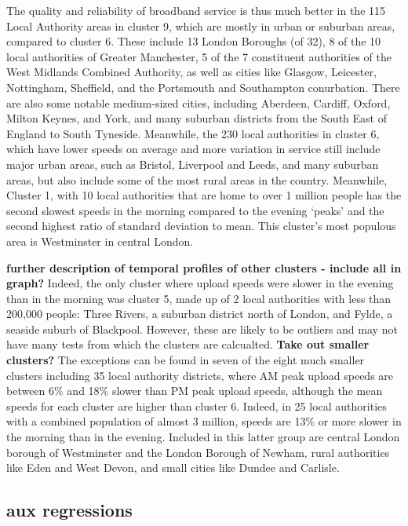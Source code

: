 \documentclass[]{interact}
\theoremstyle{plain}%
\theoremstyle{definition}
\theoremstyle{remark}
\begin{document}
The quality and reliability of broadband service is thus much better in
the 115 Local Authority areas in cluster 9, which are mostly in urban or
suburban areas, compared to cluster 6. These include 13 London Boroughs
(of 32), 8 of the 10 local authorities of Greater Manchester, 5 of the 7
constituent authorities of the West Midlands Combined Authority, as well
as cities like Glasgow, Leicester, Nottingham, Sheffield, and the
Portsmouth and Southampton conurbation. There are also some notable
medium-sized cities, including Aberdeen, Cardiff, Oxford, Milton Keynes,
and York, and many suburban districts from the South East of England to
South Tyneside. Meanwhile, the 230 local authorities in cluster 6, which
have lower speeds on average and more variation in service still include
major urban areas, such as Bristol, Liverpool and Leeds, and many
suburban areas, but also include some of the most rural areas in the
country. Meanwhile, Cluster 1, with 10 local authorities that are home
to over 1 million people has the second slowest speeds in the morning
compared to the evening `peaks' and the second highest ratio of standard
deviation to mean. This cluster's most populous area is Westminster in
central London.

\textbf{further description of temporal profiles of other clusters -
include all in graph?} Indeed, the only cluster where upload speeds were
slower in the evening than in the morning was cluster 5, made up of 2
local authorities with less than 200,000 people: Three Rivers, a
suburban district north of London, and Fylde, a seaside suburb of
Blackpool. However, these are likely to be outliers and may not have
many tests from which the clusters are calcualted. \textbf{Take out
smaller clusters?} The exceptions can be found in seven of the eight
much smaller clusters including 35 local authority districts, where AM
peak upload speeds are between 6\% and 18\% slower than PM peak upload
speeds, although the mean speeds for each cluster are higher than
cluster 6. Indeed, in 25 local authorities with a combined population of
almost 3 million, speeds are 13\% or more slower in the morning than in
the evening. Included in this latter group are central London borough of
Westminster and the London Borough of Newham, rural authorities like
Eden and West Devon, and small cities like Dundee and Carlisle.

\hypertarget{aux-regressions}{%
\subsection{aux regressions}\label{aux-regressions}}
\end{document}
